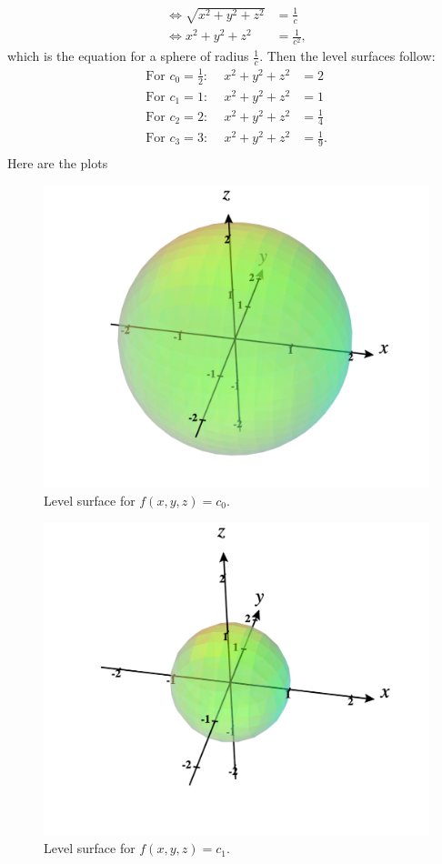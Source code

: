 \documentclass[12pt]{article} %
\begin{document}
\begin{solution}
\begin{enumerate}[(a)]
\begin{align*}
        \iff \sqrt{x^2+y^2+z^2}&=\frac{1}{c}\\
        \iff x^2+y^2+z^2 &= \frac{1}{c^2},
    \end{align*}
    which is the equation for a sphere of radius $\frac{1}{c}$.  Then the level surfaces follow:
        \begin{align*}
        \textrm{For $c_0=\frac{1}{2}$:~}\quad x^2+y^2+z^2&=2\\
        \textrm{For $c_1=1$:~}\quad x^2+y^2+z^2&=1\\
        \textrm{For $c_2=2$:~}\quad x^2+y^2+z^2&=\frac{1}{4}\\
        \textrm{For $c_3=3$:~}\quad x^2+y^2+z^2&=\frac{1}{9}.\\
    \end{align*}
    Here are the plots
    \begin{figure}[H]
        \centering
        \includegraphics[width=.6\textwidth]{Images/level_surface_c0.png}
        \caption{Level surface for $f(x,y,z)=c_0$.}
    \end{figure}
        \begin{figure}[H]
        \centering
        \includegraphics[width=.6\textwidth]{Images/level_surface_c1.png}
        \caption{Level surface for $f(x,y,z)=c_1$.}
    \end{figure}

\end{enumerate}
\end{solution}
\end{document}
